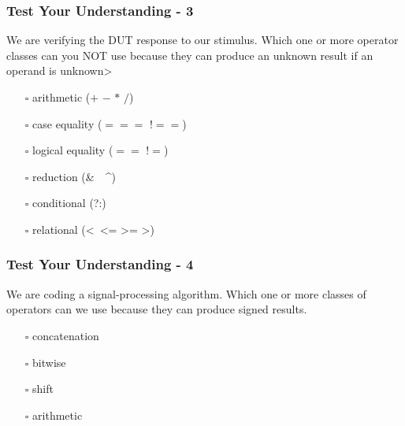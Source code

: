 \documentclass[t, notes, xcolor=table]{beamer}
\begin{document}
\begin{frame}
\frametitle{Test Your Understanding - 3}
We are verifying the DUT response to our stimulus. Which one or more operator classes can you NOT use because they can produce an unknown result if an operand is unknown>
\begin{itemize}
\item[$\square$] arithmetic ($+$ $-$ $*$ $/$)
\item[$\square$] case equality ($===$ $!==$)
\item[$\square$] logical equality ($==$ $!=$)
\item[$\square$] reduction (\&\ \textbar\ \^{})
\item[$\square$] conditional (?:)
\item[$\square$] relational (\textless\ \textless= \textgreater= \textgreater)
\end{itemize}
\end{frame}

\begin{frame}
\frametitle{Test Your Understanding - 4}
We are coding a signal-processing algorithm. Which one or more classes of operators can we use because they can produce signed results.
\begin{itemize}
\item[$\square$] concatenation
\item[$\square$] bitwise
\item[$\square$] shift
\item[$\square$] arithmetic
\end{itemize}
\end{frame}
\end{document}
